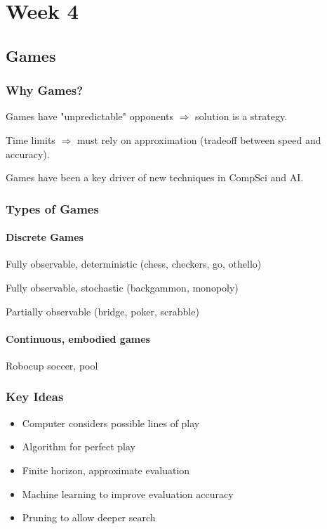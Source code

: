 \part{Week 4}
\chapter{Games}

\section{Why Games?}
Games have "unpredictable" opponents $\Rightarrow$ solution is a strategy.

Time limits $\Rightarrow$ must rely on approximation (tradeoff between speed
and accuracy).

Games have been a key driver of new techniques in CompSci and AI.

\section{Types of Games}
\subsection{Discrete Games}
Fully observable, deterministic (chess, checkers, go, othello)

Fully observable, stochastic (backgammon, monopoly)

Partially observable (bridge, poker, scrabble)

\subsection{Continuous, embodied games}
Robocup soccer, pool

\section{Key Ideas}
\begin{itemize}
    \item Computer considers possible lines of play
    \item Algorithm for perfect play
    \item Finite horizon, approximate evaluation
    \item Machine learning to improve evaluation accuracy
    \item Pruning to allow deeper search
\end{itemize}


